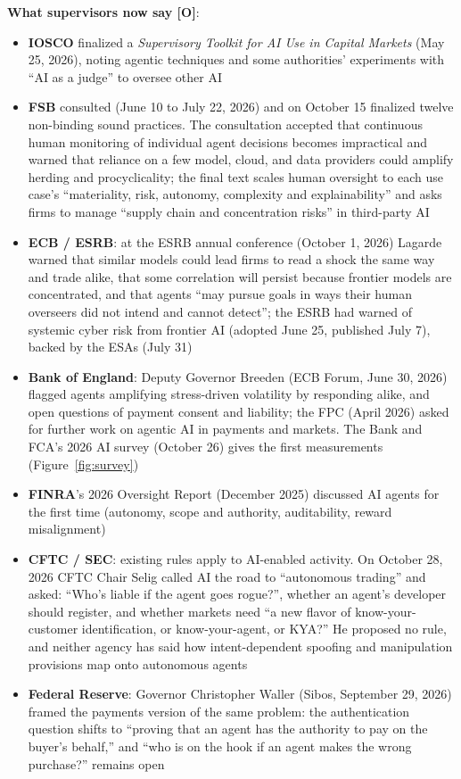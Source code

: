 \documentclass[11pt,letterpaper]{article}
\begin{document}
\textbf{What supervisors now say [O]}:
\begin{itemize}
  \item \textbf{IOSCO} finalized a \textit{Supervisory Toolkit for AI Use in Capital Markets} (May 25, 2026), noting agentic techniques and some authorities' experiments with ``AI as a judge'' to oversee other AI
  \item \textbf{FSB} consulted (June 10 to July 22, 2026) and on October 15 finalized twelve non-binding sound practices. The consultation accepted that continuous human monitoring of individual agent decisions becomes impractical and warned that reliance on a few model, cloud, and data providers could amplify herding and procyclicality; the final text scales human oversight to each use case's ``materiality, risk, autonomy, complexity and explainability'' and asks firms to manage ``supply chain and concentration risks'' in third-party AI
  \item \textbf{ECB / ESRB}: at the ESRB annual conference (October 1, 2026) Lagarde warned that similar models could lead firms to read a shock the same way and trade alike, that some correlation will persist because frontier models are concentrated, and that agents ``may pursue goals in ways their human overseers did not intend and cannot detect''; the ESRB had warned of systemic cyber risk from frontier AI (adopted June 25, published July 7), backed by the ESAs (July 31)
  \item \textbf{Bank of England}: Deputy Governor Breeden (ECB Forum, June 30, 2026) flagged agents amplifying stress-driven volatility by responding alike, and open questions of payment consent and liability; the FPC (April 2026) asked for further work on agentic AI in payments and markets. The Bank and FCA's 2026 AI survey (October 26) gives the first measurements (Figure~\ref{fig:survey})
  \item \textbf{FINRA}'s 2026 Oversight Report (December 2025) discussed AI agents for the first time (autonomy, scope and authority, auditability, reward misalignment)
  \item \textbf{CFTC / SEC}: existing rules apply to AI-enabled activity. On October 28, 2026 CFTC Chair Selig called AI the road to ``autonomous trading'' and asked: ``Who's liable if the agent goes rogue?'', whether an agent's developer should register, and whether markets need ``a new flavor of know-your-customer identification, or know-your-agent, or KYA?'' He proposed no rule, and neither agency has said how intent-dependent spoofing and manipulation provisions map onto autonomous agents
  \item \textbf{Federal Reserve}: Governor Christopher Waller (Sibos, September 29, 2026) framed the payments version of the same problem: the authentication question shifts to ``proving that an agent has the authority to pay on the buyer's behalf,'' and ``who is on the hook if an agent makes the wrong purchase?'' remains open
\end{itemize}
\end{document}

